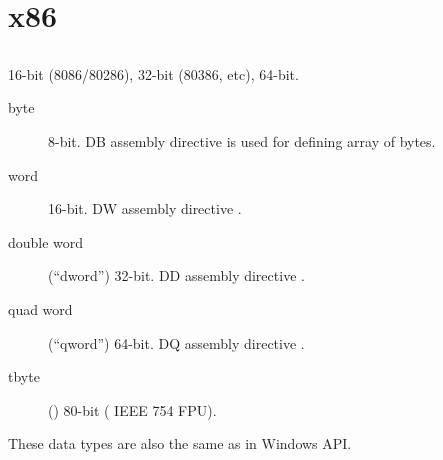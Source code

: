 \section{x86}

\subsection{}

 16-bit (8086/80286), 32-bit (80386, etc), 64-bit.

\begin{description}
	\item[byte] 8-bit. 
		{DB assembly directive is used for defining array of bytes}.
	\item[word] 16-bit. 
		{DW assembly directive \dittoclosing{}}.
	\item[double word] (``dword'') 32-bit. 
		{DD assembly directive \dittoclosing{}}.
	\item[quad word] (``qword'') 64-bit. 
		{DQ assembly directive \dittoclosing{}}.
	\item[tbyte] () 80-bit   
		( IEEE 754 FPU).
\end{description}

{These data types are also the same as in} Windows API.

